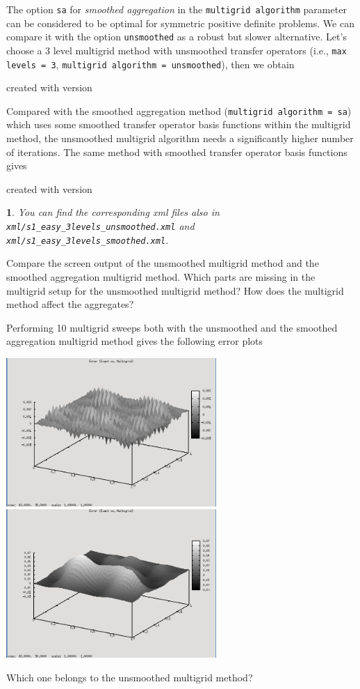 \documentclass[10pt,fleqn]{book}
\newtheorem*{mycomment}{\ding{42}}
\newcommand\printScreenOutput[1]{

{\vspace{-0.3cm}\hfill\tiny{created with \muelu version }}
}
\begin{document}
The option \texttt{sa} for \textit{smoothed aggregation} in the \texttt{multigrid algorithm} parameter can be considered to be optimal for symmetric positive definite problems. We can compare it with the option \texttt{unsmoothed} as a robust but slower alternative. Let's choose a 3 level multigrid method with unsmoothed transfer operators (i.e., \texttt{max levels = 3}, \texttt{multigrid algorithm = unsmoothed}), then we obtain
\printScreenOutput{s1_easy_3levels_unsmoothed.txt_5.fragment}

Compared with the smoothed aggregation method (\texttt{multigrid algorithm = sa}) which uses some smoothed transfer operator basis functions within the multigrid method, the unsmoothed multigrid algorithm needs a significantly higher number of iterations.
The same method with smoothed transfer operator basis functions gives
\printScreenOutput{s1_easy_3levels_smoothed.txt_5.fragment}
\begin{mycomment}
You can find the corresponding xml files also in \texttt{xml/s1\_easy\_3levels\_unsmoothed.xml} and \texttt{xml/s1\_easy\_3levels\_smoothed.xml}.
\end{mycomment}

\begin{exercise}
Compare the screen output of the unsmoothed multigrid method and the smoothed aggregation multigrid method. Which parts are missing in the multigrid setup for the unsmoothed multigrid method? How does the multigrid method affect the aggregates?
\end{exercise}
\begin{exercise}
Performing 10 multigrid sweeps both with the unsmoothed and the smoothed aggregation multigrid method gives the following error plots
 \begin{center}\includegraphics[width=8cm]{pics/tut1_11.png}
\includegraphics[width=8cm]{pics/tut1_12.png} \end{center}
 Which one belongs to the unsmoothed multigrid method?
\end{exercise}
\end{document}
